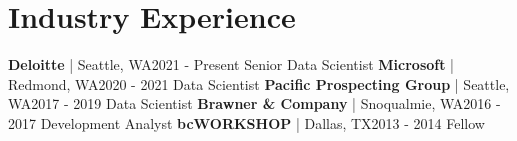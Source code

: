 \documentclass{article}
\begin{document}
    \section*{Industry Experience}
        \textbf{Deloitte} | Seattle, WA\hfill{2021 - Present}\newline
        Senior Data Scientist\newline\newline
        \textbf{Microsoft} | Redmond, WA\hfill{2020 - 2021}\newline
        Data Scientist\newline\newline
        \textbf{Pacific Prospecting Group} | Seattle, WA\hfill{2017 - 2019}\newline
        Data Scientist\newline\newline
        \textbf{Brawner \& Company} | Snoqualmie, WA\hfill{2016 - 2017}\newline
        Development Analyst\newline\newline
        \textbf{bcWORKSHOP} | Dallas, TX\hfill{2013 - 2014}\newline
        Fellow\newline
\end{document}
